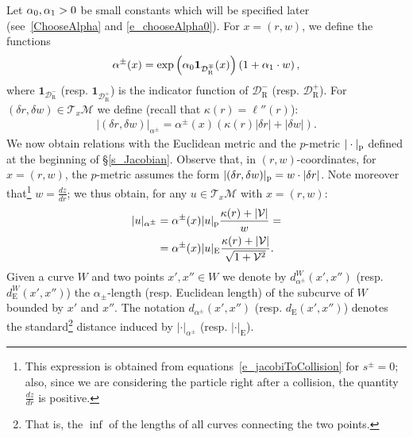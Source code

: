 \documentclass[AHL, Unicode, longabstracts,published]{cedram}
\newcommand{\ct}{r}
\newcommand{\curv}{\kappa}
\newcommand{\cslope}{\mathcal{V}}
\newcommand{\tang}{\mathcal{T}}
\newcommand{\cell}{\mathcal{D}}
\newcommand{\csp}{\mathcal{M}}
\newcommand{\recoPrivate}{\mathrm{R}}
\newcommand{\reco}{{\cell^-_{\recoPrivate}}}
\newcommand{\backReco}{{\cell^+_{\recoPrivate}}}
\newcommand{\recoMp}{{\cell^\mp_{\recoPrivate}}}
\newcommand{\deum}[1]{d\eum^{#1}}
\newcommand{\eum}{_\text{E}}
\newcommand{\pme}{_\textup{p}}
\newcommand{\admPm}{_{\alpha^{\pm}}}
\newcommand{\admFuncPm}{\alpha^{\pm}}
\newcommand\admParam[1]{
\ifnum0=#1\relax
\alpha_0
\else
\ifnum1=#1\relax
\alpha_1\fi\fi}
\newcommand{\If}{\boldsymbol{1}}
\begin{document}
Let $\admParam0,\admParam1 > 0$ be small constants which will be specified later (see~\eqref{ChooseAlpha} and \eqref{e_chooseAlpha0}). For $x = (\ct,w)$, we define the functions
\begin{align*}
\admFuncPm(x) = \exp\left(\admParam0\If_\recoMp(x)\right)\left(1+\admParam1\cdot w\right),
\end{align*}
where $\If_\reco$ (resp. $\If_{\backReco}$) is the indicator function of $\reco$ (resp. $\backReco$). For $(\delta\ct,\delta w)\in\tang_x\csp$ we define (recall that $\curv(\ct) = \ell''(\ct)$):
\begin{align}\label{eq:def-adm-metric}
|(\delta \ct, \delta w)|\admPm=\admFuncPm(x)(\curv(\ct) |\delta\ct|+|\delta w|).
\end{align}
We now obtain relations with the Euclidean metric and the $p$-metric $|\cdot|\pme$ defined at the beginning of
\S\ref{s_Jacobian}. Observe that, in $(r,w)$-coordinates, for $x = (r,w)$, the $p$-metric assumes the form $|(\delta\ct,\delta w)|\pme = w\cdot |\delta\ct|$. Note moreover that\footnote{ This expression is obtained from equations~\eqref{e_jacobiToCollision} for $s^{\pm} = 0$; also, since we are considering the particle right after a collision, the quantity $\frac{dz}{d\ct}$ is positive.} $w=\frac{dz}{d\ct}$; we thus obtain, for any $u\in\tang_{x}\csp$ with $x = (\ct,w)$:
\begin{subequations}\label{e_defAdm}
\begin{align}
|u|\admPm
&= \admFuncPm(x)|u|\pme\frac{\curv(\ct)+|\cslope|}{w} =\label{e_defAdmP}
\\%
&= \admFuncPm(x)|u|\eum\frac{\curv(\ct)+|\cslope|}{\sqrt{1 +\cslope^2}}.\label{e_defAdmE}
\end{align}
\end{subequations}
Given a curve $W$ and two points $x',x''\in W$ we denote by $d\admPm^{W}(x',x'')$ (resp. $\deum{W}(x',x'')$) the $\alpha_{\pm}$-length (resp. Euclidean length) of the subcurve of $W$ bounded by $x'$ and $x''$. The notation $d\admPm(x',x'')$ (resp. $\deum{}(x',x'')$) denotes the standard\footnote{ That is, the $\inf$ of the lengths of all curves connecting the two points.} distance induced by $|\cdot|\admPm$ (resp. $|\cdot|\eum$).
\end{document}
